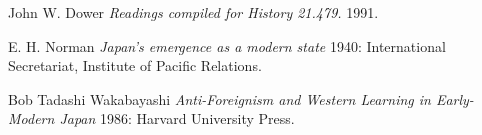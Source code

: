 \documentclass[12pt,a4paper]{article}
\begin{document}
\newpage
\begin{thebibliography}{99}
	
	 John W. Dower {\em Readings compiled for History
		21.479.}  1991.
	
	 E. H. Norman {\em Japan's emergence as a modern
		state} 1940: International Secretariat, Institute of Pacific
	Relations.
	
	 Bob Tadashi Wakabayashi {\em Anti-Foreignism and Western Learning in Early-Modern Japan} 1986: Harvard University Press.
\end{thebibliography}
\end{document}
